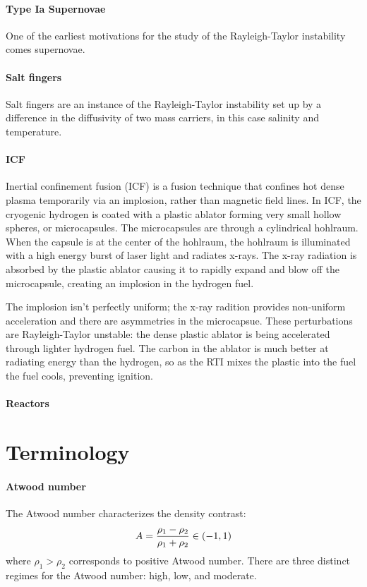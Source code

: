 \paragraph{Type Ia Supernovae}
One of the earliest motivations for the study of the Rayleigh-Taylor instability comes supernovae. 

\paragraph{Salt fingers}
Salt fingers are an instance of the Rayleigh-Taylor instability set up by a difference in the diffusivity of two mass carriers, in this case salinity and temperature.

\paragraph{ICF}
Inertial confinement fusion (ICF) is a fusion technique that confines hot dense plasma temporarily via an implosion, rather than magnetic field lines.
In ICF, the cryogenic hydrogen is coated with a plastic ablator forming very small hollow spheres, or microcapsules.
The microcapsules are through a cylindrical hohlraum.
When the capsule is at the center of the hohlraum, the hohlraum is illuminated with a high energy burst of laser light and radiates x-rays.
The x-ray radiation is absorbed by the plastic ablator causing it to rapidly expand and blow off the microcapsule, creating an implosion in the hydrogen fuel.

The implosion isn't perfectly uniform; the x-ray radition provides non-uniform acceleration and there are asymmetries in the microcapsue.
These perturbations are Rayleigh-Taylor unstable: the dense plastic ablator is being accelerated through lighter hydrogen fuel.
The carbon in the ablator is much better at radiating energy than the hydrogen, so as the RTI mixes the plastic into the fuel the fuel cools, preventing ignition.

\paragraph{Reactors}


\section{Terminology}

\paragraph{Atwood number}
The Atwood number characterizes the density contrast:
\begin{equation} \elabel{atwood}
A = \frac{\rho_1 - \rho_2}{\rho_1 + \rho_2} \in (-1,1)
\end{equation}
where $\rho_1 > \rho_2$ corresponds to positive Atwood number.
There are three distinct regimes for the Atwood number: high, low, and moderate.

